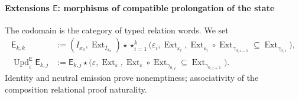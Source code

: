 \paragraph{Extensions \(\mathsf E\): morphisms of compatible prolongation of the state}
The codomain is the category of typed relation words. We set
\begin{align}
 \mathsf E_{k,k}
 &:=(I_{x_0},\operatorname{Ext}_{I_{x_0}})\star
 \mathop{\star}_{i=1}^{k}
 \bigl(\varepsilon_i,\operatorname{Ext}_{\varepsilon_i},
 \operatorname{Ext}_{\varepsilon_i}\circ
 \operatorname{Ext}_{\gamma_{0,i-1}}
 \subseteq\operatorname{Ext}_{\gamma_{0,i}}\bigr),
 \label{eq:pdfv2-terminal-semilla-e}\\
 \operatorname{Upd}^{\mathsf E}_{\varepsilon}\mathsf E_{k,j}
 &:=
 \mathsf E_{k,j}\star
 \bigl(\varepsilon,\operatorname{Ext}_{\varepsilon},
 \operatorname{Ext}_{\varepsilon}\circ
 \operatorname{Ext}_{\gamma_{0,j}}
 \subseteq\operatorname{Ext}_{\gamma_{0,j+1}}\bigr).
 \label{eq:pdfv2-terminal-update-e}
\end{align}
Identity and neutral emission prove nonemptiness; associativity of the
composition relational proof naturality.

